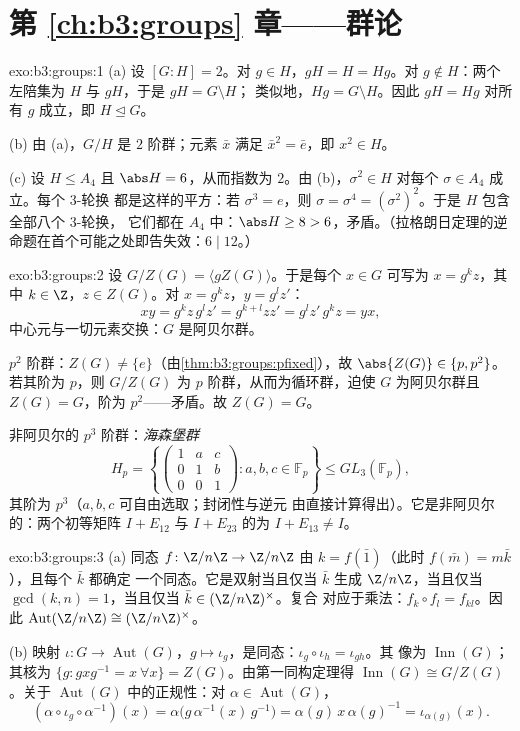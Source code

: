 \section*{第 \ref{ch:b3:groups} 章——群论}

\begin{solution}{exo:b3:groups:1}
(a) 设 $[G:H] = 2$。对 $g \in H$，$gH = H = Hg$。对 $g \notin
H$：两个左陪集为 $H$ 与 $gH$，于是 $gH = G \setminus H$；
类似地，$Hg = G \setminus H$。因此 $gH = Hg$ 对所有 $g$ 成立，即 $H
\trianglelefteq G$。

(b) 由 (a)，$G/H$ 是 $2$ 阶群；元素 $\bar x$
满足 $\bar x^2 = \bar e$，即 $x^2 \in H$。

(c) 设 $H \leq A_4$ 且 $\abs H = 6$，从而指数为 $2$。由
(b)，$\sigma^2 \in H$ 对每个 $\sigma \in A_4$ 成立。每个 $3$-轮换
都是这样的平方：若 $\sigma^3 = e$，则 $\sigma =
\sigma^4 = (\sigma^2)^2$。于是 $H$ 包含全部八个 $3$-轮换，
它们都在 $A_4$ 中：$\abs H \geq 8 > 6$，矛盾。（拉格朗日定理的逆
命题在首个可能之处即告失效：$6 \mid 12$。）
\end{solution}

\begin{solution}{exo:b3:groups:2}
设 $G/Z(G) = \langle gZ(G) \rangle$。于是每个 $x \in G$ 可写为
$x = g^k z$，其中 $k \in \Z$，$z \in Z(G)$。对 $x = g^kz$，$y =
g^l z'$：
\[
xy = g^k z\, g^l z' = g^{k+l} z z' = g^l z'\, g^k z = yx,
\]
中心元与一切元素交换：$G$ 是阿贝尔群。

$p^2$ 阶群：$Z(G) \neq \{e\}$（由\cref{thm:b3:groups:pfixed}），故
$\abs{Z(G)} \in \{p, p^2\}$。若其阶为 $p$，则 $G/Z(G)$
为 $p$ 阶群，从而为循环群，迫使 $G$ 为阿贝尔群且 $Z(G) =
G$，阶为 $p^2$——矛盾。故 $Z(G) = G$。

非阿贝尔的 $p^3$ 阶群：\emph{海森堡群}
\[
H_p = \left\{ \begin{pmatrix} 1 & a & c\\ 0 & 1 & b\\ 0 & 0 & 1
\end{pmatrix} : a, b, c \in \mathbb F_p \right\}
\leq GL_3(\mathbb F_p),
\]
其阶为 $p^3$（$a, b, c$ 可自由选取；封闭性与逆元
由直接计算得出）。它是非阿贝尔的：两个初等矩阵
$I + E_{12}$ 与 $I + E_{23}$ 的为 $I + E_{13} \neq I$。
\end{solution}

\begin{solution}{exo:b3:groups:3}
(a) 同态 $f \colon \Z/n\Z \to \Z/n\Z$ 由 $k =
f(\bar 1)$（此时 $f(\bar m) = m\bar k$），且每个 $\bar k$ 都确定
一个同态。它是双射当且仅当 $\bar k$ 生成 $\Z/n\Z$，当且仅当
$\gcd(k,n) = 1$，当且仅当 $\bar k \in (\Z/n\Z)^\times$。复合
对应于乘法：$f_k \circ f_l = f_{kl}$。因此
$\operatorname{Aut}(\Z/n\Z) \cong (\Z/n\Z)^\times$。

(b) 映射 $\iota\colon G \to \operatorname{Aut}(G)$，$g \mapsto
\iota_g$，是同态：$\iota_g \circ \iota_h = \iota_{gh}$。其
像为 $\operatorname{Inn}(G)$；其核为 $\{g : gxg^{-1} =
x\ \forall x\} = Z(G)$。由第一同构定理得
$\operatorname{Inn}(G) \cong G/Z(G)$。关于
$\operatorname{Aut}(G)$ 中的正规性：对 $\alpha \in \operatorname{Aut}(G)$，
\[
(\alpha \circ \iota_g \circ \alpha^{-1})(x)
= \alpha\bigl(g\,\alpha^{-1}(x)\,g^{-1}\bigr)
= \alpha(g)\, x\, \alpha(g)^{-1} = \iota_{\alpha(g)}(x).
\]
\end{solution}

